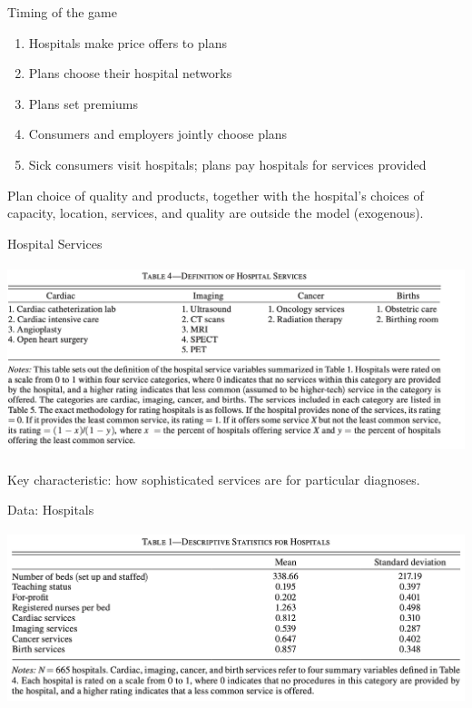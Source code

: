\documentclass[xcolor=pdftex,dvipsnames,table,mathserif,aspectratio=169]{beamer}
\begin{document}
\begin{frame}{Timing of the game}
\begin{enumerate}
\item Hospitals make price offers to plans
\item Plans choose their hospital networks
\item Plans set premiums
\item Consumers and employers jointly choose plans
\item Sick consumers visit hospitals; plans pay hospitals for services provided
\end{enumerate}
Plan choice of quality and products, together with the hospital's choices of capacity, location, services, and quality are outside the model (exogenous).
\end{frame}

\begin{frame}{Hospital Services}
\begin{center}
\includegraphics[height=5.5cm]{./resources/ho_table4.png}
\end{center}
Key characteristic: how sophisticated services are for particular diagnoses.
\end{frame}

\begin{frame}{Data: Hospitals}
\begin{center}
\includegraphics[height=5cm]{./resources/ho_table1.png}
\end{center}
\end{frame}
\end{document}
